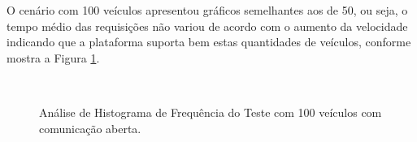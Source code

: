 \documentclass[
	12pt,				%
	oneside,			%
	a4paper,			%
	english,			%
	brazil				%
	]{abntex2ppgsi}
\begin{document}
O cenário com 100 veículos apresentou gráficos semelhantes aos de 50, ou seja, o tempo médio das requisições não variou de acordo com o aumento da velocidade indicando que a plataforma suporta bem estas quantidades de veículos, conforme mostra a Figura \ref{fig:imgHistFreq100}.

\begin{figure}[h!]
	\caption{Análise de Histograma de Frequência do Teste  com 100 veículos com comunicação aberta.}
	\centering
	\label{fig:imgHistFreq100}
	\\
\end{figure}
\end{document}
